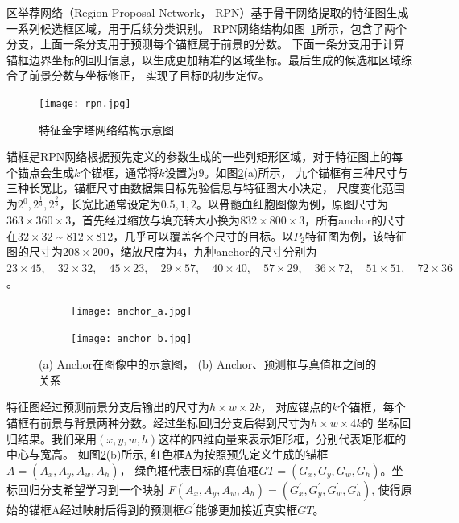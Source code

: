 区举荐网络（Region Proposal Network， RPN）基于骨干网络提取的特征图生成一系列候选框区域，用于后续分类识别。
RPN网络结构如图~\ref{fig:rpn}所示，包含了两个分支，上面一条分支用于预测每个锚框属于前景的分数。
下面一条分支用于计算锚框边界坐标的回归信息，以生成更加精准的区域坐标。最后生成的候选框区域综合了前景分数与坐标修正，
实现了目标的初步定位。

\begin{figure}               
  \centering                
  \texttt{[image: rpn.jpg]}                
  \caption{特征金字塔网络结构示意图}                
  \label{fig:rpn}     
\end{figure}   

锚框是RPN网络根据预先定义的参数生成的一些列矩形区域，对于特征图上的每个锚点会生成$k$个锚框，通常将$k$设置为$9$。如图\ref{fig:anchor}(a)所示，
九个锚框有三种尺寸与三种长宽比，锚框尺寸由数据集目标先验信息与特征图大小决定，
尺度变化范围为$2^0, 2^{\frac{1}{3}},  2^{\frac{2}{3}}$，长宽比通常设定为$0.5, 1, 2$。以骨髓血细胞图像为例，原图尺寸为
$363 \times 360 \times 3$，首先经过缩放与填充转大小换为$832 \times 800 \times 3$，所有anchor的尺寸在$32 \times 32$ \textasciitilde
$812 \times 812$，几乎可以覆盖各个尺寸的目标。以$P_2$特征图为例，该特征图的尺寸为$208 \times 200$，缩放尺度为4，九种anchor的尺寸分别为
$23 \times 45,\quad32 \times 32,\quad45 \times 23,\quad29 \times 57,\quad40 \times 40,\quad57 \times 29,\quad36 \times 72,\quad51 \times 51,\quad72 \times 36$。

\begin{figure}[htbp]
	\centering
	\begin{subfigure}{0.45\linewidth}
		\centering
		\texttt{[image: anchor\_a.jpg]}
    \caption{}
	\end{subfigure}
	\centering
	\begin{subfigure}{0.45\linewidth}
		\centering
		\texttt{[image: anchor\_b.jpg]}
    \caption{}
	\end{subfigure}
	\caption{(a) Anchor在图像中的示意图， (b) Anchor、预测框与真值框之间的关系}
	\label{fig:anchor}
\end{figure}

特征图经过预测前景分支后输出的尺寸为$h\times w \times 2k$，
对应锚点的$k$个锚框，每个锚框有前景与背景两种分数。经过坐标回归分支后得到尺寸为$h\times w \times 4k$的
坐标回归结果。我们采用$(x, y, w, h)$这样的四维向量来表示矩形框，分别代表矩形框的中心与宽高。
如图\ref{fig:anchor}(b)所示, 红色框A为按照预先定义生成的锚框$A = \left( {{A_x},{A_y},{A_w},{A_h}} \right)$，
绿色框代表目标的真值框$GT = \left( {{G_x},{G_y},{G_w},{G_h}} \right)$。坐标回归分支希望学习到一个映射
$F\left(A_{x}, A_{y}, A_{w}, A_{h}\right)=\left(G_{x}^{\prime}, G_{y}^{\prime}, G_{w}^{\prime}, G_{h}^{\prime}\right)$,
使得原始的锚框A经过映射后得到的预测框$G^{\prime}$能够更加接近真实框$GT$。

